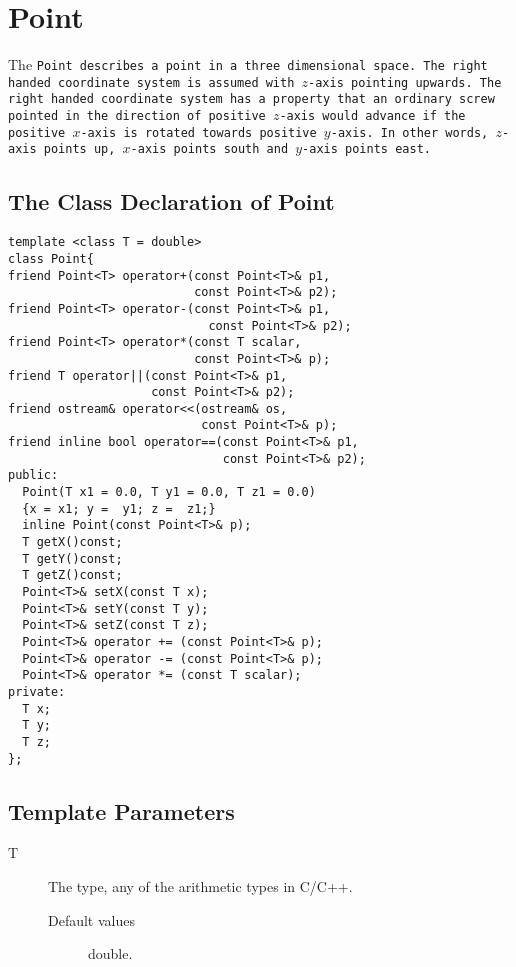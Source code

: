 \section{Point}

The \tt Point \rm describes a point in a three dimensional space.  The
right  handed  coordinate  system is  assumed  with $z$-axis  pointing
upwards. The  right handed coordinate   system has a property  that an
ordinary  screw  pointed in  the  direction of positive $z$-axis would
advance     if  the positive   $x$-axis is   rotated  towards positive
$y$-axis.  In  other   words, $z$-axis   points   up, $x$-axis  points
south and $y$-axis points east.

\subsection{The Class Declaration of Point}
\begin{verbatim}
template <class T = double>
class Point{
friend Point<T> operator+(const Point<T>& p1, 
                          const Point<T>& p2);
friend Point<T> operator-(const Point<T>& p1,
                            const Point<T>& p2);
friend Point<T> operator*(const T scalar, 
                          const Point<T>& p);
friend T operator||(const Point<T>& p1, 
                    const Point<T>& p2);
friend ostream& operator<<(ostream& os, 
                           const Point<T>& p);
friend inline bool operator==(const Point<T>& p1, 
                              const Point<T>& p2);
public:
  Point(T x1 = 0.0, T y1 = 0.0, T z1 = 0.0)
  {x = x1; y =  y1; z =  z1;}
  inline Point(const Point<T>& p);
  T getX()const;
  T getY()const;
  T getZ()const;
  Point<T>& setX(const T x);
  Point<T>& setY(const T y);
  Point<T>& setZ(const T z);
  Point<T>& operator += (const Point<T>& p); 
  Point<T>& operator -= (const Point<T>& p);
  Point<T>& operator *= (const T scalar);
private:
  T x;
  T y;
  T z;
};
\end{verbatim}

\subsection{Template Parameters}
\begin{description}
  \item[T] The type, any of the arithmetic types in C/C++.
    \begin{description}
      \item[Default values] double.
     \end{description}
\end{description}

